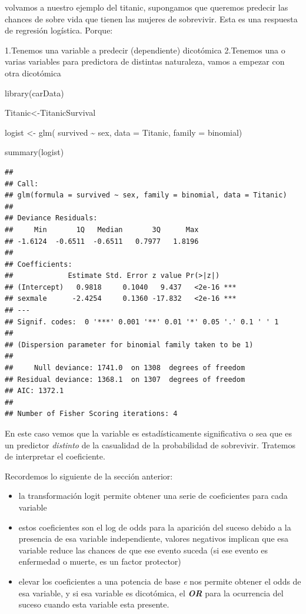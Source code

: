 \documentclass[
]{book}
\newenvironment{Shaded}{\begin{snugshade}}{\end{snugshade}}
\newcommand{\AttributeTok}[1]{\textcolor[rgb]{0.77,0.63,0.00}{#1}}
\newcommand{\FunctionTok}[1]{\textcolor[rgb]{0.00,0.00,0.00}{#1}}
\newcommand{\NormalTok}[1]{#1}
\newcommand{\OtherTok}[1]{\textcolor[rgb]{0.56,0.35,0.01}{#1}}
\newcommand{\SpecialCharTok}[1]{\textcolor[rgb]{0.00,0.00,0.00}{#1}}
\begin{document}
volvamos a nuestro ejemplo del titanic, supongamos que queremos predecir las chances de sobre vida que tienen las mujeres de sobrevivir. Esta es una respuesta de regresión logística. Porque:

1.Tenemos una variable a predecir (dependiente) dicotómica
2.Tenemos una o varias variables para predictora de distintas naturaleza, vamos a empezar con otra dicotómica

\begin{Shaded}
\begin{Highlighting}[]
\FunctionTok{library}\NormalTok{(carData)}

\NormalTok{Titanic}\OtherTok{\textless{}{-}}\NormalTok{TitanicSurvival}


\NormalTok{logist }\OtherTok{\textless{}{-}} \FunctionTok{glm}\NormalTok{( survived }\SpecialCharTok{\textasciitilde{}}\NormalTok{ sex, }\AttributeTok{data =}\NormalTok{ Titanic, }\AttributeTok{family =}\NormalTok{ binomial)}

\FunctionTok{summary}\NormalTok{(logist)}
\end{Highlighting}
\end{Shaded}

\begin{verbatim}
## 
## Call:
## glm(formula = survived ~ sex, family = binomial, data = Titanic)
## 
## Deviance Residuals: 
##     Min       1Q   Median       3Q      Max  
## -1.6124  -0.6511  -0.6511   0.7977   1.8196  
## 
## Coefficients:
##             Estimate Std. Error z value Pr(>|z|)    
## (Intercept)   0.9818     0.1040   9.437   <2e-16 ***
## sexmale      -2.4254     0.1360 -17.832   <2e-16 ***
## ---
## Signif. codes:  0 '***' 0.001 '**' 0.01 '*' 0.05 '.' 0.1 ' ' 1
## 
## (Dispersion parameter for binomial family taken to be 1)
## 
##     Null deviance: 1741.0  on 1308  degrees of freedom
## Residual deviance: 1368.1  on 1307  degrees of freedom
## AIC: 1372.1
## 
## Number of Fisher Scoring iterations: 4
\end{verbatim}

En este caso vemos que la variable es estadísticamente significativa o sea que es un predictor \emph{distinto} de la casualidad de la probabilidad de sobrevivir. Tratemos de interpretar el coeficiente.

Recordemos lo siguiente de la sección anterior:

\begin{itemize}
\item
  la transformación logit permite obtener una serie de coeficientes para cada variable
\item
  estos coeficientes son el log de odds para la aparición del suceso debido a la presencia de esa variable independiente, valores negativos implican que esa variable reduce las chances de que ese evento suceda (si ese evento es enfermedad o muerte, es un factor protector)
\item
  elevar los coeficientes a una potencia de base \emph{e} nos permite obtener el odds de esa variable, y si esa variable es dicotómica, el \textbf{\emph{OR}} para la ocurrencia del suceso cuando esta variable esta presente.
\end{itemize}
\end{document}

